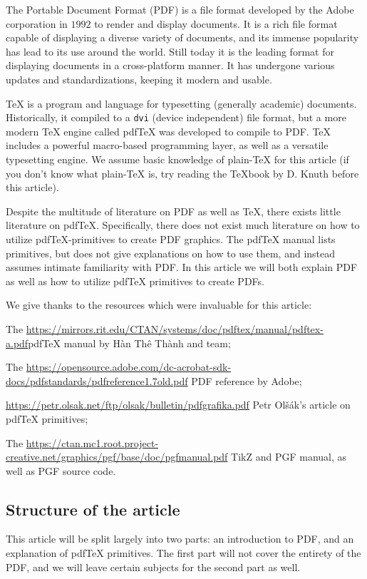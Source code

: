 The Portable Document Format (PDF) is a file format developed by the Adobe corporation in $1992$ to render and
display documents.
It is a rich file format capable of displaying a diverse variety of documents, and its immense popularity has
lead to its use around the world.
Still today it is the leading format for displaying documents in a cross-platform manner.
It has undergone various updates and standardizations, keeping it modern and usable.

\TeX{} is a program and language for typesetting (generally academic) documents.
Historically, it compiled to a {\tt dvi} (device independent) file format, but a more modern \TeX{} engine
called pdf\TeX{} was developed to compile to PDF.
\TeX{} includes a powerful macro-based programming layer, as well as a versatile typesetting engine.
We assume basic knowledge of plain-\TeX{} for this article (if you don't know what plain-\TeX{} is, try reading
the \TeX book by D. Knuth before this article).

Despite the multitude of literature on PDF as well as \TeX, there exists little literature on pdf\TeX.
Specifically, there does not exist much literature on how to utilize pdf\TeX-primitives to create PDF graphics.
The pdf\TeX{} manual lists primitives, but does not give explanations on how to use them, and instead assumes
intimate familiarity with PDF.
In this article we will both explain PDF as well as how to utilize pdf\TeX{} primitives to create PDFs.

We give thanks to the resources which were invaluable for this article:
\blist
    \item The \url{https://mirrors.rit.edu/CTAN/systems/doc/pdftex/manual/pdftex-a.pdf}{pdf\TeX{} manual} by
    H\`an Th\^e\llap{\raise 0.5ex\hbox{\'{}}} Th\`anh and team;
    \item The \url{https://opensource.adobe.com/dc-acrobat-sdk-docs/pdfstandards/pdfreference1.7old.pdf}
    {PDF reference} by Adobe;
    \item \url{https://petr.olsak.net/ftp/olsak/bulletin/pdfgrafika.pdf}
    {Petr Ol\v s\'ak's article on pdf\TeX{} primitives};
    \item The \url{https://ctan.mc1.root.project-creative.net/graphics/pgf/base/doc/pgfmanual.pdf}
    {TikZ and PGF manual}, as well as PGF source code.
\elist

\subsection*{Structure of the article}

This article will be split largely into two parts: an introduction to PDF, and an explanation of pdf\TeX{}
primitives.
The first part will not cover the entirety of the PDF, and we will leave certain subjects for the second part
as well.

